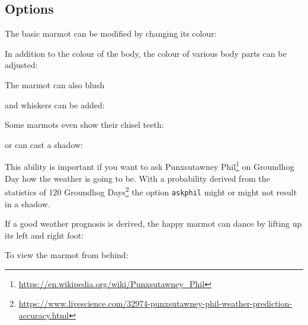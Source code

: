 \documentclass[parskip=half]{scrartcl}
\begin{document}
\subsection{Options}

The basic marmot can be modified by changing its colour:
\begin{tcblisting}{}
\marmot[body=blue]
\end{tcblisting}

In addition to the colour of the body, the colour of various body parts can be adjusted:
\begin{tcblisting}{}
\marmot[eye=red]
\end{tcblisting}
\begin{tcblisting}{}
\marmot[mouth=red]
\end{tcblisting}

The marmot can also blush
\begin{tcblisting}{}
\marmot[blush]
\end{tcblisting}

and whiskers can be added:
\begin{tcblisting}{}
\marmot[whiskers=gray]
\end{tcblisting}

Some marmots even show their chisel teeth:
\begin{tcblisting}{}
\marmot[teeth=white]
\end{tcblisting}

or can cast a shadow:
\begin{tcblisting}{}
\marmot[shadow]
\end{tcblisting}

This ability is important if you want to ask Punxsutawney Phil\footnote{\url{https://en.wikipedia.org/wiki/Punxsutawney_Phil}} on Groundhog Day how the weather is going to be. With a probability derived from the statistics of 120 Groundhog Days\footnote{\url{https://www.livescience.com/32974-punxsutawney-phil-weather-prediction-accuracy.html}} the option \lstinline|askphil| might or might not result in a shadow.
\begin{tcblisting}{}
\marmot[askphil]
\end{tcblisting}

If a good weather prognosis is derived, the happy marmot can dance by lifting up its left and right foot: 
\begin{tcblisting}{}
\marmot[leftstep]
\marmot[rightstep,xshift=2cm]
\end{tcblisting}

To view the marmot from behind:
\begin{tcblisting}{}
\marmot[back]
\end{tcblisting}
\end{document}
